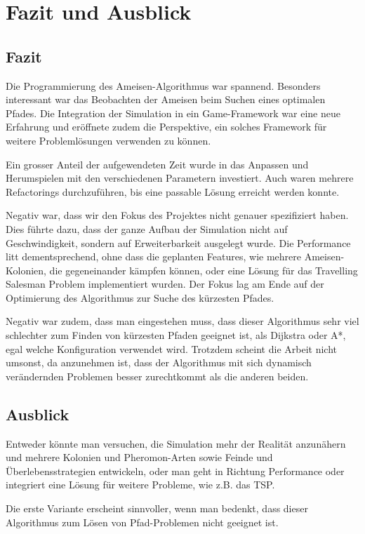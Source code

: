 
\chapter{Fazit und Ausblick}

\section{Fazit}

Die Programmierung des Ameisen-Algorithmus war spannend. Besonders interessant war das Beobachten der Ameisen beim Suchen eines optimalen Pfades. Die Integration der Simulation in ein Game-Framework war eine neue Erfahrung und eröffnete zudem die Perspektive, ein solches Framework für weitere Problemlösungen verwenden zu können.

Ein grosser Anteil der aufgewendeten Zeit wurde in das Anpassen und Herumspielen mit den verschiedenen Parametern investiert. Auch waren mehrere Refactorings durchzuführen, bis eine passable Lösung erreicht werden konnte.

Negativ war, dass wir den Fokus des Projektes nicht genauer spezifiziert haben. Dies führte dazu, dass der ganze Aufbau der Simulation nicht auf Geschwindigkeit, sondern auf Erweiterbarkeit ausgelegt wurde. Die Performance litt dementsprechend, ohne dass die geplanten Features, wie mehrere Ameisen-Kolonien, die gegeneinander kämpfen können, oder eine Lösung für das Travelling Salesman Problem implementiert wurden. Der Fokus lag am Ende auf der Optimierung des Algorithmus zur Suche des kürzesten Pfades.

Negativ war zudem, dass man eingestehen muss, dass dieser Algorithmus sehr viel schlechter zum Finden von kürzesten Pfaden geeignet ist, als Dijkstra oder A*, egal welche Konfiguration verwendet wird. Trotzdem scheint die Arbeit nicht umsonst, da anzunehmen ist, dass der Algorithmus mit sich dynamisch verändernden Problemen besser zurechtkommt als die anderen beiden.

\section{Ausblick}

Entweder könnte man versuchen, die Simulation mehr der Realität anzunähern und mehrere Kolonien und Pheromon-Arten sowie Feinde und Überlebensstrategien entwickeln, oder man geht in Richtung Performance oder integriert eine Lösung für weitere Probleme, wie z.B. das TSP.

Die erste Variante erscheint sinnvoller, wenn man bedenkt, dass dieser Algorithmus zum Lösen von Pfad-Problemen nicht geeignet ist.


